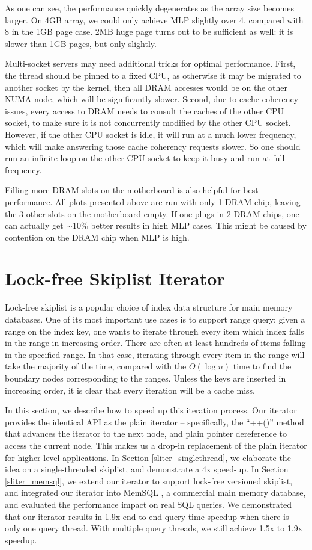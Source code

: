 \documentclass[11pt, usletter]{article}
\begin{document}
As one can see, the performance quickly degenerates as the array size becomes larger. 
On 4GB array, we could only achieve MLP slightly over 4, compared with 8 in the 1GB page case. 
2MB huge page turns out to be sufficient as well: it is slower than 1GB pages, but only slightly.

Multi-socket servers may need additional tricks for optimal performance.
First, the thread should be pinned to a fixed CPU, as otherwise it may be migrated to another socket 
by the kernel, then all DRAM accesses would be on the other NUMA node, which will be significantly slower. 
Second, due to cache coherency issues, every access to DRAM needs to consult the caches of the other CPU socket, 
to make sure it is not concurrently modified by the other CPU socket. 
However, if the other CPU socket is idle, it will run at a much lower frequency, 
which will make answering those cache coherency requests slower. 
So one should run an infinite loop on the other CPU socket to keep it busy and run at full frequency. 

Filling more DRAM slots on the motherboard is also helpful for best performance. 
All plots presented above are run with only 1 DRAM chip, 
leaving the 3 other slots on the motherboard empty.
If one plugs in 2 DRAM chips, one can actually get $\sim$10\% better results in high MLP cases.
This might be caused by contention on the DRAM chip when MLP is high.

\section{Lock-free Skiplist Iterator} \label{sliter}

Lock-free skiplist is a popular choice of index data structure for main memory databases.
One of its most important use cases is to support range query: 
given a range on the index key, one wants to iterate through every item which index falls in the range in increasing order.
There are often at least hundreds of items falling in the specified range.
In that case, iterating through every item in the range will take the majority of the time, 
compared with the $O(\log n)$ time to find the boundary nodes corresponding to the ranges.
Unless the keys are inserted in increasing order, it is clear that every iteration will be a cache miss.

In this section, we describe how to speed up this iteration process. 
Our iterator provides the identical API as the plain iterator 
-- specifically, the ``++()'' method that advances the iterator to the next node,
and plain pointer dereference to access the current node.
This makes us a drop-in replacement of the plain iterator for higher-level applications.
In Section \ref{sliter_singlethread}, 
we elaborate the idea on a single-threaded skiplist, 
and demonstrate a 4x speed-up. 
In Section \ref{sliter_memsql}, 
we extend our iterator to support lock-free versioned skiplist, 
and integrated our iterator into MemSQL \cite{memsql}, a commercial main memory database, 
and evaluated the performance impact on real SQL queries. 
We demonstrated that our iterator results in 1.9x end-to-end query time speedup when there is only one query thread. 
With multiple query threads, we still achieve 1.5x to 1.9x speedup.
\end{document}
